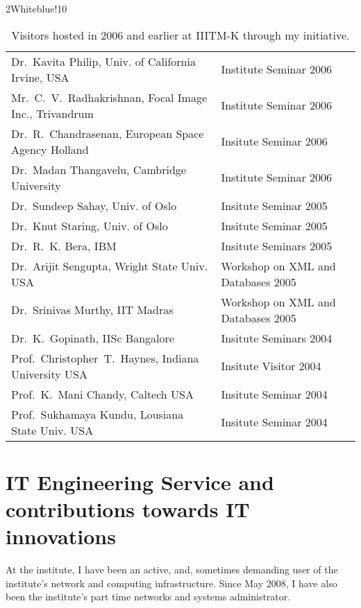 \documentclass[titlepage, %
11pt, 
]{article}
\begin{document}
\begin{table}
\rowcolors%
{2}{White}{blue!10}
\setlength\extrarowheight{4pt}
\begin{tabular}%
{|p{0.6\linewidth}|p{0.6\linewidth}|}
\hline
\multicolumn{1}{|m{0.6\linewidth}|}{\centering {\bf Person and Affiliation}}&
\multicolumn{1}{m{0.6\linewidth}|}{\centering {\bf Event and Date}}\\
\hline
%
Dr.~Kavita Philip, Univ. of California Irvine, USA & Institute Seminar 2006\\
%
Mr.~C.~V.~Radhakrishnan, Focal Image Inc., Trivandrum & Institute  Seminar 2006\\
%
Dr.~R.~Chandrasenan, European Space Agency  Holland  & Insitute Seminar 2006\\
%
Dr.~Madan Thangavelu, Cambridge University & Institute Seminar 2006\\
%
Dr.~Sundeep Sahay, Univ. of Oslo  & Insitute Seminar 2005\\
%
Dr.~Knut Staring, Univ. of Oslo  & Insitute Seminar 2005\\
%
Dr.~R.~K. Bera, IBM  & Insitute Seminars 2005\\
%
Dr.~Arijit Sengupta, Wright State Univ. USA & Workshop on XML and Databases 2005\\
%
Dr.~Srinivas Murthy, IIT Madras & Workshop on XML and Databases 2005\\
%
Dr.~K.~Gopinath, IISc Bangalore  & Insitute Seminars 2004\\
%
Prof.~Christopher~T.~Haynes, Indiana University USA  & Insitute Visitor 2004\\
%
Prof.~K.~Mani Chandy, Caltech USA  & Insitute Seminar 2004\\
%
Prof.~Sukhamaya Kundu, Lousiana State Univ. USA  & Insitute Seminar 2004\\
%
\hline
\end{tabular}
\caption{Visitors hosted in 2006 and earlier at IIITM-K through my initiative.
\label{tbl:visitors-2006}}
\end{table}

\section{IT Engineering Service and  contributions towards IT innovations}
\label{sec:it-innovations}

At the institute, I have been an active, and, sometimes
demanding user of the institute's network and computing
infrastructure.  Since May 2008, I have also been the
institute's part time networks and systems administrator.
\end{document}
